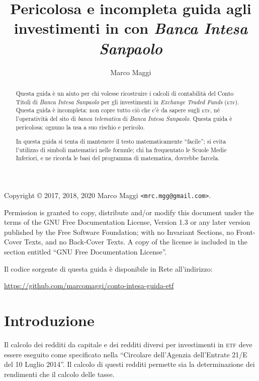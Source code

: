 \documentclass[12pt,a4paper]{article}
\author{Marco Maggi}
\title{Pericolosa e incompleta guida agli investimenti in \Etf{} con \emph{Banca Intesa Sanpaolo}}
\newcommand{\Parentesi}[1]{(#1)}
\newcommand{\Etf}[1]{\textsc{etf}}
\begin{document}
\maketitle

\begin{abstract}
  \noindent
  Questa guida è un  aiuto per chi volesse ricostruire i calcoli di  contabilità del Conto Titoli di
  \emph{Banca   Intesa   Sanpaolo}   per   gli  investimenti   in   \emph{Exchange   Traded   Funds}
  \Parentesi{\Etf{}}.   Questa guida  è incompleta:  non copre  tutto ciò  che c'è  da sapere  sugli
  \Etf{}, né  l'operatività del  sito di  \emph{banca telematica}  di \emph{Banca  Intesa Sanpaolo}.
  Questa guida è pericolosa: ognuno la usa a suo rischio e pericolo.

  In questa guida si tenta di mantenere  il testo matematicamente ``facile''; si evita l'utilizzo di
  simboli matematici nelle  formule; chi ha frequentato  le Scuole Medie Inferiori, e  ne ricorda le
  basi del programma di matematica, dovrebbe farcela.
\end{abstract}

\tableofcontents

\newpage{}

\noindent
Copyright \copyright{} 2017, 2018, 2020 Marco Maggi \texttt{<mrc.mgg@gmail.com>}.

Permission is  granted to copy, distribute  and/or modify this document  under the terms of  the GNU
Free  Documentation License,  Version  1.3 or  any  later  version published  by  the Free  Software
Foundation; with no  Invariant Sections, no Front-Cover  Texts, and no Back-Cover Texts.   A copy of
the license is included in the section entitled ``GNU Free Documentation License''.

Il codice sorgente di questa guida è disponibile in Rete all'indirizzo:
\begin{center}
  \url{https://github.com/marcomaggi/conto-intesa-guida-etf}
\end{center}

\newpage{}

\section{Introduzione}


Il calcolo  dei redditi da  capitale e dei  redditi diversi per  investimenti in \Etf{}  deve essere
eseguito come specificato nella ``Circolare dell'Agenzia dell'Entrate 21/E del 10 Luglio 2014''.  Il
calcolo di questi redditi permette sia la determinazione dei rendimenti che il calcolo delle tasse.
\end{document}
